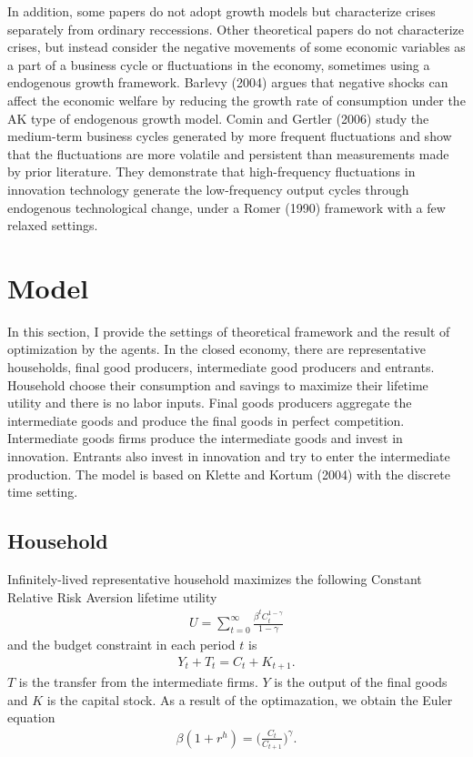 \documentclass[a4paper,12pt]{article}
\begin{document}
In addition, some papers do not adopt growth models but characterize crises separately from ordinary reccessions. Other theoretical papers do not characterize crises, but instead consider the negative movements of some economic variables as a part of a business cycle or fluctuations in the economy, sometimes using a endogenous growth framework. Barlevy (2004) argues that negative shocks can affect the economic welfare by reducing the growth rate of consumption under the AK type of endogenous growth model. Comin and Gertler (2006) study the medium-term business cycles generated by more frequent fluctuations and show that the fluctuations are more volatile and persistent than measurements made by prior literature. They demonstrate that high-frequency fluctuations in innovation technology generate the low-frequency output cycles through endogenous technological change, under a Romer (1990) framework with a few relaxed settings.\par

\section{Model}
In this section, I provide the settings of theoretical framework and the result of optimization by the agents. In the closed economy, there are representative households, final good producers, intermediate good producers and entrants. Household choose their consumption and savings to maximize their lifetime utility and there is no labor inputs. Final goods producers aggregate the intermediate goods and produce the final goods in perfect competition. Intermediate goods firms produce the intermediate goods and invest in innovation. Entrants also invest in innovation and try to enter the intermediate production. The model is based on Klette and Kortum (2004) with the discrete time setting. 
\subsection{Household}
Infinitely-lived representative household maximizes the following Constant Relative Risk Aversion lifetime utility
\begin{align}
    U = \sum_{t=0}^\infty \frac{\beta^t C_t^{1-\gamma}}{1-\gamma}
\end{align}
and the budget constraint in each period $t$ is 
\begin{align}
    Y_t + T_t = C_t + K_{t+1}.
\end{align}
$T$ is the transfer from the intermediate firms. $Y$ is the output of the final goods and $K$ is the capital stock. As a result of the optimazation, we obtain the Euler equation
\begin{align}
    \beta ( 1+r^h) = \bigg(\frac{C_t}{C_{t+1}}\bigg)^\gamma.
\end{align}
\end{document}
